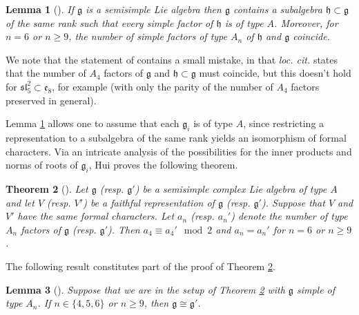 \documentclass{amsart}
\newtheorem{theorem}{Theorem}[section]
\newtheorem{lemma}[theorem]{Lemma}
\theoremstyle{definition}
\numberwithin{equation}{section} %
\newcommand{\sllie}{\mathfrak{sl}}
\newcommand{\mf}[1]{\mathfrak{#1}}
\begin{document}
\begin{lemma}[{\cite[Lemma 2.5]{hui2013monodromy}}] \label{lemma: maximal type A subalgebras}
If $\mf{g}$ is a semisimple Lie algebra then $\mf{g}$ contains a subalgebra $\mf{h} \subset \mf{g}$ of the same rank such that every simple factor of $\mf{h}$ is of type $A$.
Moreover, for $n=6$ or $n \geq 9$, the number of simple factors of type $A_n$ of $\mf{h}$ and $\mf{g}$ coincide.
\end{lemma}

We note that the statement of \cite[Lemma 2.5]{hui2013monodromy} contains a small mistake, in that \textit{loc. cit.} states that the number of $A_4$ factors of $\mf{g}$ and $\mf{h} \subset \mf{g}$ must coincide, but this doesn't hold for $\sllie_5^2 \subset \mf{e}_8$, for example (with only the parity of the number of $A_4$ factors preserved in general).

Lemma \ref{lemma: maximal type A subalgebras} allows one to assume that each $\mf{g}_i$ is of type $A$, since restricting a representation to a subalgebra of the same rank yields an isomorphism of formal characters.
Via an intricate analysis of the possibilities for the inner products and norms of roots of $\mf{g}_i$, Hui proves the following theorem. 

\begin{theorem}[{\cite[Theorems 2.14, 2.17]{hui2013monodromy}}] \label{thm: formal char type a subalgebra equivalence} 
Let $\mf{g}$ (resp. $\mf{g}'$) be a semisimple complex Lie algebra of type $A$ and let $V$ (resp. $V'$) be a faithful representation of $\mf{g}$ (resp. $\mf{g}'$).
Suppose that $V$ and $V'$ have the same formal characters.
Let $a_n$ (resp. $a_n'$) denote the number of type $A_n$ factors of $\mf{g}$ (resp. $\mf{g}'$).
Then $a_4 \equiv a_4' \mod 2$ and $a_n = a_n'$ for $n = 6$ or $n \geq 9$.
\end{theorem}

The following result constitutes part of the proof of Theorem \ref{thm: formal char type a subalgebra equivalence}. 

\begin{lemma}[{\cite[\S 2.3]{hui2013monodromy}}] \label{lemma: type A_n isomorphic for most n}
Suppose that we are in the setup of Theorem \ref{thm: formal char type a subalgebra equivalence} with $\mf{g}$ simple of type $A_n$.
If $n \in \{4,5,6\}$ or $n \geq 9$, then $\mf{g} \cong \mf{g}'$.
\end{lemma}
\end{document}

